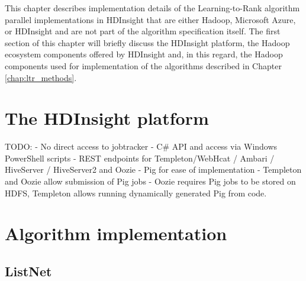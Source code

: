 This chapter describes implementation details of the Learning-to-Rank algorithm parallel implementations in HDInsight that are either Hadoop, Microsoft Azure, or HDInsight and are not part of the algorithm specification itself. The first section of this chapter will briefly discuss the HDInsight platform, the Hadoop ecosystem components offered by HDInsight and, in this regard, the Hadoop components used for implementation of the algorithms described in Chapter \ref{chap:ltr_methods}.

\section{The HDInsight platform}
TODO:
 - No direct access to jobtracker
 - C# API and access via Windows PowerShell scripts
 - REST endpoints for Templeton/WebHcat / Ambari / HiveServer / HiveServer2 and Oozie
 - Pig for ease of implementation
 - Templeton and Oozie allow submission of Pig jobs
 - Oozie requires Pig jobs to be stored on HDFS, Templeton allows running dynamically generated Pig from code.

\section{Algorithm implementation}
\subsection{ListNet}